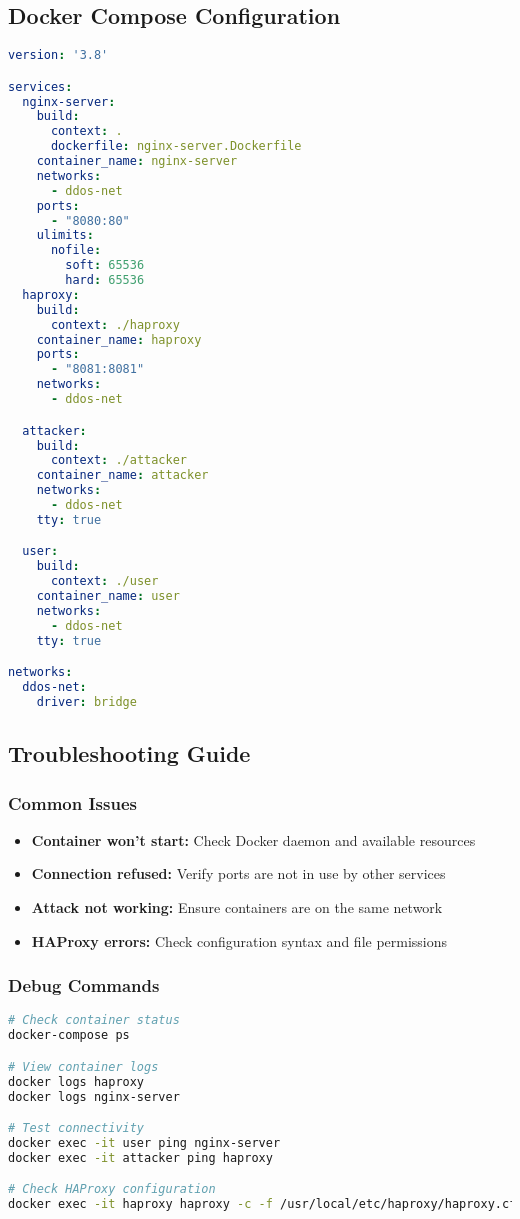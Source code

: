 \documentclass[12pt]{article}
\begin{document}
\subsection{Docker Compose Configuration}
\begin{lstlisting}[language=yaml, caption=Docker Compose Configuration]
version: '3.8'

services:
  nginx-server:
    build:
      context: .
      dockerfile: nginx-server.Dockerfile
    container_name: nginx-server
    networks:
      - ddos-net
    ports:
      - "8080:80"
    ulimits:
      nofile:
        soft: 65536
        hard: 65536
  haproxy:
    build:
      context: ./haproxy
    container_name: haproxy
    ports:
      - "8081:8081"
    networks:
      - ddos-net

  attacker:
    build:
      context: ./attacker
    container_name: attacker
    networks:
      - ddos-net
    tty: true

  user:
    build:
      context: ./user
    container_name: user
    networks:
      - ddos-net
    tty: true

networks:
  ddos-net:
    driver: bridge
\end{lstlisting}

\subsection{Troubleshooting Guide}

\subsubsection{Common Issues}
\begin{itemize}
    \item \textbf{Container won't start:} Check Docker daemon and available resources
    \item \textbf{Connection refused:} Verify ports are not in use by other services
    \item \textbf{Attack not working:} Ensure containers are on the same network
    \item \textbf{HAProxy errors:} Check configuration syntax and file permissions
\end{itemize}

\subsubsection{Debug Commands}
\begin{lstlisting}[language=bash]
# Check container status
docker-compose ps

# View container logs
docker logs haproxy
docker logs nginx-server

# Test connectivity
docker exec -it user ping nginx-server
docker exec -it attacker ping haproxy

# Check HAProxy configuration
docker exec -it haproxy haproxy -c -f /usr/local/etc/haproxy/haproxy.cfg
\end{lstlisting}
\end{document}
